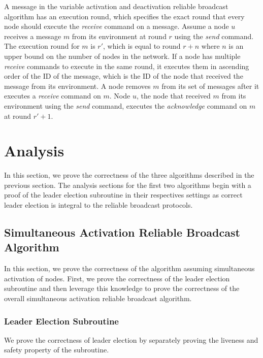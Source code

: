 \documentclass[english]{article}
\begin{document}
A message in the variable activation and deactivation reliable broadcast algorithm has an execution round, which specifies the exact round that every node should execute the \textit{receive} command on a message. Assume a node $u$ receives a message $m$ from its environment at round $r$ using the \textit{send} command. The execution round for $m$ is $r'$, which is equal to round $r + n$ where $n$ is an upper bound on the number of nodes in the network. If a node has multiple \textit{receive} commands to execute in the same round, it executes them in ascending order of the ID of the message, which is the ID of the node that received the message from its environment. A node removes $m$ from its set of messages after it executes a \textit{receive} command on $m$. Node $u$, the node that received $m$ from its environment using the \textit{send} command, executes the \textit{acknowledge} command on $m$ at round $r' + 1$.


\section{Analysis}

In this section, we prove the correctness of the three algorithms described in the previous section. The analysis sections for the first two algorithms begin with a proof of the leader election subroutine in their respectives settings as correct leader election is integral to the reliable broadcast protocols.

\subsection {Simultaneous Activation Reliable Broadcast Algorithm}

In this section, we prove the correctness of the algorithm assuming simultaneous activation of nodes. First, we prove the correctness of the leader election subroutine and then leverage this knowledge to prove the correctness of the overall simultaneous activation reliable broadcast algorithm.

\subsubsection{Leader Election Subroutine}

We prove the correctness of leader election by separately proving the liveness and safety property of the subroutine.
\end{document}
